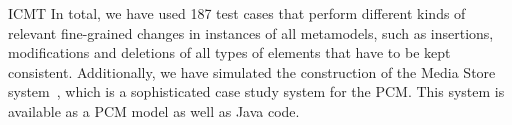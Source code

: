 \begin{copiedFrom}{ICMT}
In total, we have used 187 test cases that perform different kinds of relevant fine-grained changes in instances of all metamodels, such as insertions, modifications and deletions of all types of elements that have to be kept consistent.
Additionally, we have simulated the construction of the Media Store system~\cite{strittmatter2016a}, which is a sophisticated case study system for the \ac{PCM}.
This system is available as a \ac{PCM} model as well as Java code.




\end{copiedFrom}
